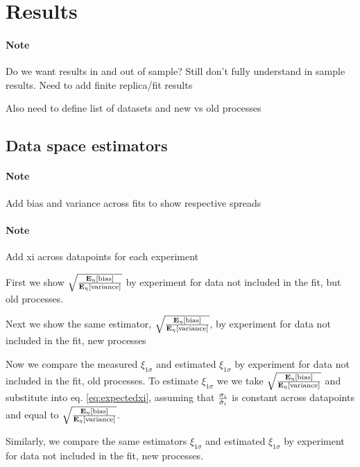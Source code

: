 \section{Results}
\paragraph{Note}{Do we want results in and out of sample? Still don't
fully understand in sample results. Need to add finite replica/fit results}

Also need to define list of datasets and new vs old processes

\subsection{Data space estimators}

\paragraph{Note}{Add bias and variance across fits to show respective spreads}

\paragraph{Note}{Add xi across datapoints for each experiment}

First we show $\sqrt{\frac{\mathbf{E}_{\eta}\left[ {\rm bias} \right]}{\mathbf{E}_{\eta}\left[ {\rm variance} \right]}}$ by experiment for data
not included in the fit, but old processes.



Next we show the same estimator, $\sqrt{\frac{\mathbf{E}_{\eta}\left[ {\rm bias} \right]}{\mathbf{E}_{\eta}\left[ {\rm variance} \right]}}$, by
experiment for data not included in the fit, new processes



Now we compare the measured $\xi_{1\sigma}$ and estimated $\xi_{1\sigma}$ by experiment
for data not included in the fit, old processes. To estimate $\xi_{1\sigma}$
we we take $\sqrt{\frac{\mathbf{E}_{\eta}\left[ {\rm bias} \right]}{\mathbf{E}_{\eta}\left[ {\rm variance} \right]}}$ and substitute into
eq. \eqref{eq:expectedxi}, assuming that $\frac{\sigma_i}{\hat{\sigma}_i}$ is
constant across datapoints and equal to $\sqrt{\frac{\mathbf{E}_{\eta}\left[ {\rm bias} \right]}{\mathbf{E}_{\eta}\left[ {\rm variance} \right]}}$.



Similarly, we compare the same estimators $\xi_{1\sigma}$ and estimated
$\xi_{1\sigma}$ by experiment for data not included in the fit, new processes.


